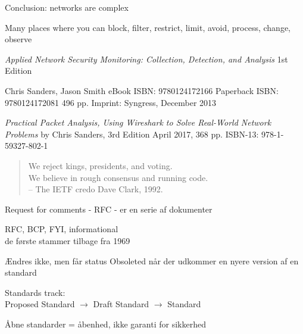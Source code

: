 \documentclass[Screen16to9,17pt]{foils}
\begin{document}

\begin{list1}
\item Conclusion: networks are complex
\item Many places where you can block, filter, restrict, limit, avoid, process, change, observe
\end{list1}



\emph{Applied Network Security Monitoring: Collection, Detection, and Analysis}
1st Edition

Chris Sanders, Jason Smith
eBook ISBN: 9780124172166
Paperback ISBN: 9780124172081 496 pp.
Imprint: Syngress, December 2013

{\footnotesize{}}


\emph{Practical Packet Analysis,
Using Wireshark to Solve Real-World Network Problems}
by Chris Sanders, 3rd Edition
April 2017, 368 pp.
ISBN-13:
978-1-59327-802-1




\begin{quote}
We reject kings, presidents, and voting.\\
We believe in rough consensus and running code.\\
-- The IETF credo Dave Clark, 1992.
\end{quote}

\begin{list1}
\item Request for comments - RFC - er en serie af dokumenter
\item RFC, BCP, FYI, informational\\
de første stammer tilbage fra 1969
\item Ændres ikke, men får status Obsoleted når der udkommer en nyere
  version af en standard
\item Standards track:\\
Proposed Standard $\rightarrow$ Draft Standard $\rightarrow$ Standard
\item  Åbne standarder = åbenhed, ikke garanti for sikkerhed
\end{list1}
\end{document}
